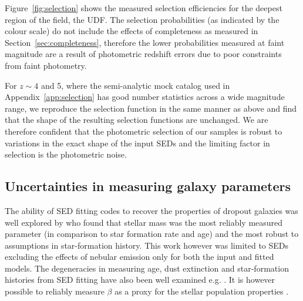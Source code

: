 \begin{figure*}
\caption{Selection efficiencies for the Ultra Deep Field region of the CANDELS field. The colour scale represents the fraction of input galaxies which pass the $P(z)$ criteria for a given redshift bin as a function of input redshift and apparent magnitude. The dashed white line in the lower sections of the figure shows the 80\% contour in the fraction of recovered galaxies. The upper panels show the recovery fraction as a function of redshift at a fixed input magnitude, $\textup{H}_{160} = 25$ (continuous) and $\textup{H}_{160} = 27$ (dashed).}
\label{fig:selection}
\end{figure*}

Figure~\ref{fig:selection} shows the measured selection efficiencies for  the deepest region of the field, the UDF. The selection probabilities (as indicated by the colour scale) do not include the effects of completeness as measured in Section~\ref{sec:completeness}, therefore the lower probabilities measured at faint magnitude are a result of photometric redshift errors due to poor constraints from faint photometry.

For $z\sim 4$ and 5, where the semi-analytic mock catalog used in Appendix~\ref{app:selection} has good number statistics across a wide magnitude range, we reproduce the selection function in the same manner as above and find that the shape of the resulting selection functions are unchanged. We are therefore confident that the photometric selection of our samples is robust to variations in the exact shape of the input SEDs and the limiting factor in selection is the photometric noise.

\subsection{Uncertainties in measuring galaxy parameters}
The ability of SED fitting codes to recover the properties of dropout galaxies was well explored by \citet{2010ApJ...725.1644L} who found that stellar mass was the most reliably measured parameter (in comparison to star formation rate and age) and the most robust to assumptions in star-formation history. This work however was limited to SEDs excluding the effects of nebular emission only for both the input and fitted models. The degeneracies in measuring age, dust extinction and star-formation histories from SED fitting have also been well examined e.g. \citet{2010A&A...515A..73S}. It is however possible to reliably measure $\beta$ as a proxy for the stellar population properties \citep{2012ApJ...756..164F,2013MNRAS.429.2456R}.

